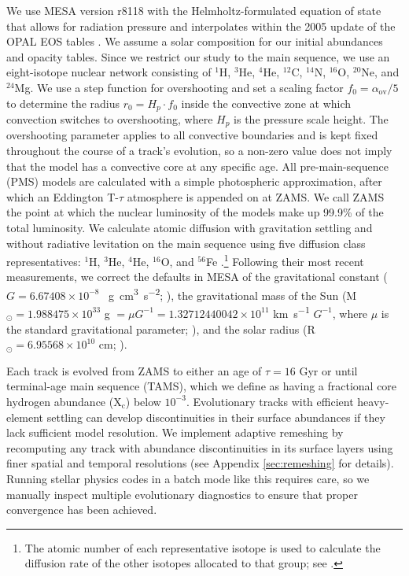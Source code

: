 \documentclass[manuscript,linenumbers]{aastex6}
\newif\ifref
\newcommand{\mb}[1]{\ifref\boldmath\textbf{#1}\unboldmath\else #1\fi}
\begin{document}
We use MESA version r8118 with the Helmholtz-formulated equation of state that allows for radiation pressure and interpolates within the 2005 update of the OPAL EOS tables \citep{2002ApJ...576.1064R}. We assume a \citet{1998SSRv...85..161G} solar composition for our initial abundances and opacity tables. Since we restrict our study to the main sequence, we use an eight-isotope nuclear network consisting of $^1$H, $^3$He, $^4$He, $^{12}$C, $^{14}$N, $^{16}$O, $^{20}$Ne, and $^{24}$Mg. We use a step function for overshooting and set a scaling factor $f_0 = \alpha_{\text{ov}}/5$ to determine the radius $r_0 = H_p \cdot f_0$ inside the convective zone at which convection switches to overshooting, where $H_p$ is the pressure scale height. \mb{The overshooting parameter applies to all convective boundaries and is kept fixed throughout the course of a track's evolution, so a non-zero value does not imply that the model has a convective core at any specific age.} %
All pre-main-sequence (PMS) models are calculated with a simple photospheric approximation, after which an Eddington T-$\tau$ atmosphere is appended on at ZAMS. We call ZAMS the point at which the nuclear luminosity of the models make up 99.9\% of the total luminosity. We calculate atomic diffusion with gravitation settling and without radiative levitation on the main sequence using five diffusion class representatives: $^1$H, $^3$He, $^4$He, $^{16}$O, and $^{56}$Fe \citep{burgers1969flow}.\footnote{The atomic number of each representative isotope is used to calculate the diffusion rate of the other isotopes allocated to that group; see \citet{Paxton2011}.} 
Following their most recent measurements, we correct the defaults in MESA of the gravitational constant ($G=6.67408\times 10^{-8}$ \si{\per\g\cm\cubed\per\square\s}; \citealt{2015arXiv150707956M}), the gravitational mass of the Sun (M$_\odot = 1.988475\times 10^{33}$ \si{\g} $= \mu G^{-1} = 1.32712440042\times 10^{11}$ \si{\km\per\s} $G^{-1}$, where $\mu$ is the standard gravitational parameter; \citealt{pitjeva2015determination}), and the solar radius (R$_\odot = 6.95568\times 10^{10}$ \si{\cm}; \citealt{2008ApJ...675L..53H}). 

Each track is evolved from ZAMS to either an age of $\tau=16$ Gyr or until terminal-age main sequence (TAMS), which we define as having a fractional core hydrogen abundance (X$_{\text{c}}$) below $10^{-3}$. Evolutionary tracks with efficient heavy-element settling can develop discontinuities in their surface abundances if they lack sufficient model resolution. We implement adaptive remeshing by recomputing any track with abundance discontinuities in its surface layers using finer spatial and temporal resolutions (see Appendix \mb{\ref{sec:remeshing}} for details). Running stellar physics codes in a batch mode like this requires care, so we manually inspect multiple evolutionary diagnostics to ensure that proper convergence has been achieved. %
\end{document}

